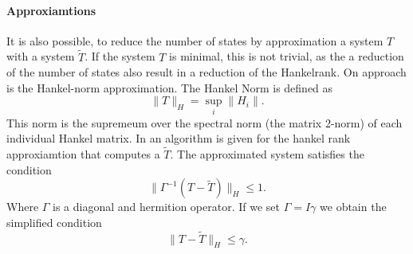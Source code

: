 \documentclass[doctype=mastersthesis,BCOR=15mm,biblatex]{ldvbook}%
\newcommand{\eye}{I} %
\begin{document}
\paragraph{Approxiamtions}
It is also possible, to reduce the number of states by approximation a system $T$ with a system $\tilde{T}$.
If the system $T$ is minimal, this is not trivial, as the a reduction of the number of states also result in a reduction of the Hankelrank.
On approach is the Hankel-norm approximation.
The Hankel Norm is defined as
\begin{equation}
	\|T\|_H = \sup_{i}\|H_i\|.
\end{equation}
This norm is the supremeum over the spectral norm (the matrix 2-norm) of each individual Hankel matrix.
In \cite{dewilde_time-varying_1998} an algorithm is given for the hankel rank approxiamtion that computes a $\tilde{T}$.
The approximated system satisfies the condition
\begin{equation}
	\| \Gamma^{-1}(T-\tilde{T})\|_H \leq 1.
\end{equation}
Where $\Gamma$ is a diagonal and hermition operator. 
If we set $\Gamma = \eye\gamma$ we obtain the simplified condition
\begin{equation}
	\|T-\tilde{T}\|_H \leq \gamma.
\end{equation}
\end{document}
